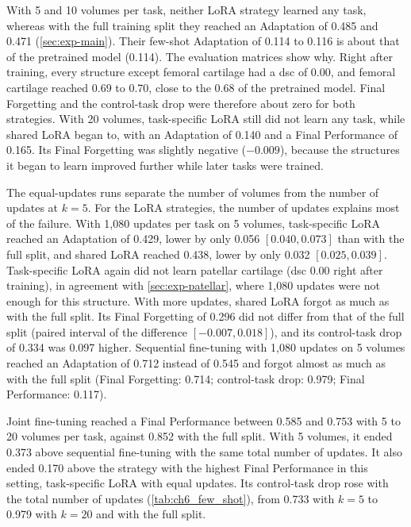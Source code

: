 With 5 and 10 volumes per task, neither LoRA strategy learned any task, whereas with the full training split they reached an Adaptation of 0.485 and 0.471 (\cref{sec:exp-main}).
Their few-shot Adaptation of 0.114 to 0.116 is about that of the pretrained model (0.114).
The evaluation matrices show why.
Right after training, every structure except femoral cartilage had a \gls{dsc} of 0.00, and femoral cartilage reached 0.69 to 0.70, close to the 0.68 of the pretrained model.
Final Forgetting and the control-task drop were therefore about zero for both strategies.
With 20 volumes, task-specific LoRA still did not learn any task, while shared LoRA began to, with an Adaptation of 0.140 and a Final Performance of 0.165.
Its Final Forgetting was slightly negative ($-0.009$), because the structures it began to learn improved further while later tasks were trained.

The equal-updates runs separate the number of volumes from the number of updates at $k = 5$.
For the LoRA strategies, the number of updates explains most of the failure.
With 1{,}080 updates per task on 5 volumes, task-specific LoRA reached an Adaptation of 0.429, lower by only 0.056 $[0.040, 0.073]$ than with the full split, and shared LoRA reached 0.438, lower by only 0.032 $[0.025, 0.039]$.
Task-specific LoRA again did not learn patellar cartilage (\gls{dsc} 0.00 right after training), in agreement with \cref{sec:exp-patellar}, where 1{,}080 updates were not enough for this structure.
With more updates, shared LoRA forgot as much as with the full split.
Its Final Forgetting of 0.296 did not differ from that of the full split (paired interval of the difference $[-0.007, 0.018]$), and its control-task drop of 0.334 was 0.097 higher.
Sequential fine-tuning with 1{,}080 updates on 5 volumes reached an Adaptation of 0.712 instead of 0.545 and forgot almost as much as with the full split (Final Forgetting: 0.714; control-task drop: 0.979; Final Performance: 0.117).

Joint fine-tuning reached a Final Performance between 0.585 and 0.753 with 5 to 20 volumes per task, against 0.852 with the full split.
With 5 volumes, it ended 0.373 above sequential fine-tuning with the same total number of updates.
It also ended 0.170 above the strategy with the highest Final Performance in this setting, task-specific LoRA with equal updates.
Its control-task drop rose with the total number of updates (\cref{tab:ch6_few_shot}), from 0.733 with $k = 5$ to 0.979 with $k = 20$ and with the full split.

